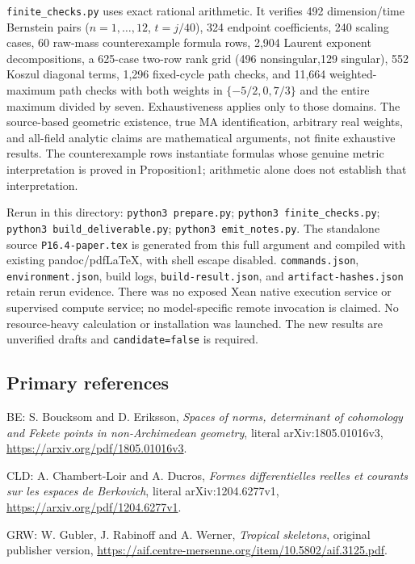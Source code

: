\documentclass[
  11pt,
]{article}
\begin{document}
\texttt{finite\_checks.py} uses exact rational arithmetic. It verifies
492 dimension/time Bernstein pairs (\(n=1,\ldots,12\), \(t=j/40\)), 324
endpoint coefficients, 240 scaling cases, 60 raw-mass counterexample
formula rows, 2,904 Laurent exponent decompositions, a 625-case two-row
rank grid (496 nonsingular,129 singular), 552 Koszul diagonal terms,
1,296 fixed-cycle path checks, and 11,664 weighted-maximum path checks
with both weights in \(\{-5/2,0,7/3\}\) and the entire maximum divided
by seven. Exhaustiveness applies only to those domains. The source-based
geometric existence, true MA identification, arbitrary real weights, and
all-field analytic claims are mathematical arguments, not finite
exhaustive results. The counterexample rows instantiate formulas whose
genuine metric interpretation is proved in Proposition1; arithmetic
alone does not establish that interpretation.

Rerun in this directory: \texttt{python3\ prepare.py};
\texttt{python3\ finite\_checks.py};
\texttt{python3\ build\_deliverable.py};
\texttt{python3\ emit\_notes.py}. The standalone source
\texttt{P16.4-paper.tex} is generated from this full argument and
compiled with existing pandoc/pdfLaTeX, with shell escape disabled.
\texttt{commands.json}, \texttt{environment.json}, build logs,
\texttt{build-result.json}, and \texttt{artifact-hashes.json} retain
rerun evidence. There was no exposed Xean native execution service or
supervised compute service; no model-specific remote invocation is
claimed. No resource-heavy calculation or installation was launched. The
new results are unverified drafts and \texttt{candidate=false} is
required.

\subsection{Primary references}\label{primary-references}

BE: S. Boucksom and D. Eriksson, \emph{Spaces of norms, determinant of
cohomology and Fekete points in non-Archimedean geometry}, literal
arXiv:1805.01016v3, \url{https://arxiv.org/pdf/1805.01016v3}.

CLD: A. Chambert-Loir and A. Ducros, \emph{Formes differentielles
reelles et courants sur les espaces de Berkovich}, literal
arXiv:1204.6277v1, \url{https://arxiv.org/pdf/1204.6277v1}.

GRW: W. Gubler, J. Rabinoff and A. Werner, \emph{Tropical skeletons},
original publisher version,
\url{https://aif.centre-mersenne.org/item/10.5802/aif.3125.pdf}.
\end{document}
